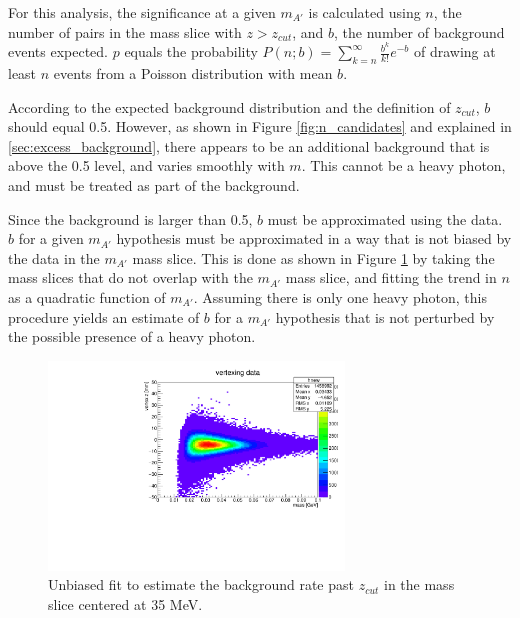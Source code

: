 For this analysis, the significance at a given $m_{A'}$ is calculated using $n$, the number of pairs in the mass slice with $z>z_{cut}$, and $b$, the number of background events expected.
$p$ equals the probability $P(n;b) = \sum^{\infty}_{k=n} \frac{b^k}{k!} e^{-b}$ of drawing at least $n$ events from a Poisson distribution with mean $b$.

According to the expected background distribution and the definition of $z_{cut}$, $b$ should equal 0.5.
However, as shown in Figure \ref{fig:n_candidates} and explained in \ref{sec:excess_background}, there appears to be an additional background that is above the 0.5 level, and varies smoothly with $m$.
This cannot be a heavy photon, and must be treated as part of the background.

Since the background is larger than 0.5, $b$ must be approximated using the data.
$b$ for a given $m_{A'}$ hypothesis must be approximated in a way that is not biased by the data in the $m_{A'}$ mass slice.
This is done as shown in Figure \ref{fig:bkg_fit} by taking the mass slices that do not overlap with the $m_{A'}$ mass slice, and fitting the trend in $n$ as a quadratic function of $m_{A'}$.
Assuming there is only one heavy photon, this procedure yields an estimate of $b$ for a $m_{A'}$ hypothesis that is not perturbed by the possible presence of a heavy photon.

\begin{figure}[ht]
\begin{center}
    \includegraphics[width=0.7\textwidth,page=164,angle=-90]{vertexing/figs/golden_mres}
\end{center}
\caption{Unbiased fit to estimate the background rate past $z_{cut}$ in the mass slice centered at 35 MeV.}
    \label{fig:bkg_fit}
\end{figure}

